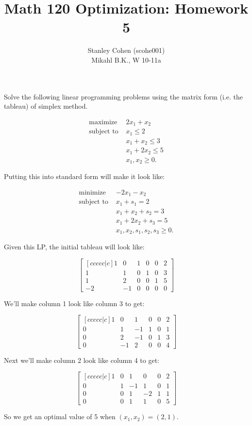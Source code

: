 \documentclass[12pt]{extarticle}
\title{Math 120 Optimization: Homework 5}
\author{Stanley Cohen (scohe001) \\ Mikahl B.K., W 10-11a}
\date{}
\theoremstyle{definition}
\begin{document}
\maketitle


Solve the following linear programming problems using the matrix form (i.e. the tableau) of simplex method.

\begin{problem}

	\begin{align*}
	\text{maximize } &2x_1+x_2\\
	\text{subject to } &x_1\leq 2\\
	&x_1+x_2\leq 3\\
	&x_1+2x_2\leq 5\\
	&x_1, x_2\geq 0.
	\end{align*}

	Putting this into standard form will make it look like:

	\begin{align*}
	\text{minimize } &-2x_1-x_2\\
	\text{subject to } &x_1 + s_1 = 2\\
	&x_1+x_2+s_2 = 3\\
	&x_1+2x_2+s_3 = 5\\
	&x_1, x_2, s_1, s_2, s_3 \geq 0.
	\end{align*}

	Given this LP, the initial tableau will look like:

	$$\begin{bmatrix}[ccccc|c] 1&0&1&0&0&2\\1&1&0&1&0&3\\1&2&0&0&1&5\\-2&-1&0&0&0&0\end{bmatrix}$$

	We'll make column 1 look like column 3 to get:

	$$\begin{bmatrix}[ccccc|c] 1&0&1&0&0&2\\0&1&-1&1&0&1\\0&2&-1&0&1&3\\0&-1&2&0&0&4\end{bmatrix}$$

	Next we'll make column 2 look like column 4 to get:

	$$\begin{bmatrix}[ccccc|c] 1&0&1&0&0&2\\0&1&-1&1&0&1\\0&0&1&-2&1&1\\0&0&1&1&0&5\end{bmatrix}$$

	So we get an optimal value of 5 when $(x_1,x_2)=(2,1)$.


\end{problem}
\end{document}
